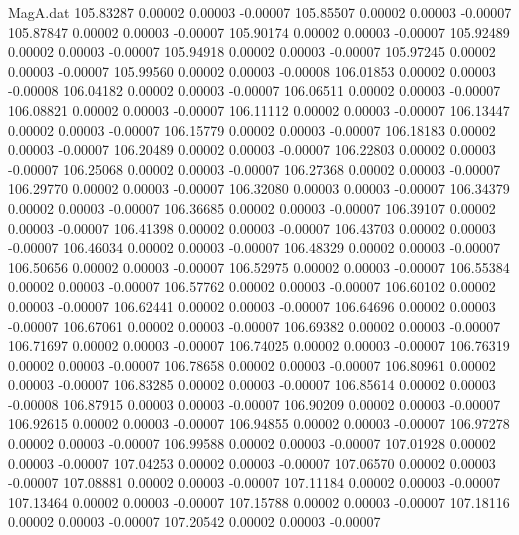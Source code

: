 \begin{filecontents}{MagA.dat}
 105.83287    0.00002    0.00003   -0.00007
 105.85507    0.00002    0.00003   -0.00007
 105.87847    0.00002    0.00003   -0.00007
 105.90174    0.00002    0.00003   -0.00007
 105.92489    0.00002    0.00003   -0.00007
 105.94918    0.00002    0.00003   -0.00007
 105.97245    0.00002    0.00003   -0.00007
 105.99560    0.00002    0.00003   -0.00008
 106.01853    0.00002    0.00003   -0.00008
 106.04182    0.00002    0.00003   -0.00007
 106.06511    0.00002    0.00003   -0.00007
 106.08821    0.00002    0.00003   -0.00007
 106.11112    0.00002    0.00003   -0.00007
 106.13447    0.00002    0.00003   -0.00007
 106.15779    0.00002    0.00003   -0.00007
 106.18183    0.00002    0.00003   -0.00007
 106.20489    0.00002    0.00003   -0.00007
 106.22803    0.00002    0.00003   -0.00007
 106.25068    0.00002    0.00003   -0.00007
 106.27368    0.00002    0.00003   -0.00007
 106.29770    0.00002    0.00003   -0.00007
 106.32080    0.00003    0.00003   -0.00007
 106.34379    0.00002    0.00003   -0.00007
 106.36685    0.00002    0.00003   -0.00007
 106.39107    0.00002    0.00003   -0.00007
 106.41398    0.00002    0.00003   -0.00007
 106.43703    0.00002    0.00003   -0.00007
 106.46034    0.00002    0.00003   -0.00007
 106.48329    0.00002    0.00003   -0.00007
 106.50656    0.00002    0.00003   -0.00007
 106.52975    0.00002    0.00003   -0.00007
 106.55384    0.00002    0.00003   -0.00007
 106.57762    0.00002    0.00003   -0.00007
 106.60102    0.00002    0.00003   -0.00007
 106.62441    0.00002    0.00003   -0.00007
 106.64696    0.00002    0.00003   -0.00007
 106.67061    0.00002    0.00003   -0.00007
 106.69382    0.00002    0.00003   -0.00007
 106.71697    0.00002    0.00003   -0.00007
 106.74025    0.00002    0.00003   -0.00007
 106.76319    0.00002    0.00003   -0.00007
 106.78658    0.00002    0.00003   -0.00007
 106.80961    0.00002    0.00003   -0.00007
 106.83285    0.00002    0.00003   -0.00007
 106.85614    0.00002    0.00003   -0.00008
 106.87915    0.00003    0.00003   -0.00007
 106.90209    0.00002    0.00003   -0.00007
 106.92615    0.00002    0.00003   -0.00007
 106.94855    0.00002    0.00003   -0.00007
 106.97278    0.00002    0.00003   -0.00007
 106.99588    0.00002    0.00003   -0.00007
 107.01928    0.00002    0.00003   -0.00007
 107.04253    0.00002    0.00003   -0.00007
 107.06570    0.00002    0.00003   -0.00007
 107.08881    0.00002    0.00003   -0.00007
 107.11184    0.00002    0.00003   -0.00007
 107.13464    0.00002    0.00003   -0.00007
 107.15788    0.00002    0.00003   -0.00007
 107.18116    0.00002    0.00003   -0.00007
 107.20542    0.00002    0.00003   -0.00007

\end{filecontents}
